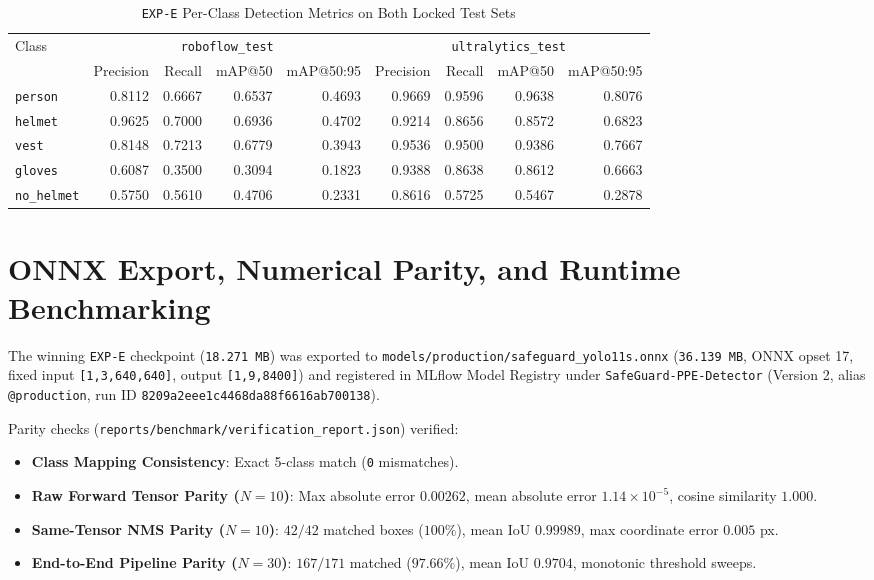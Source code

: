 \documentclass[11pt,a4paper]{article}
\begin{document}
\begin{table}[H]
\centering
\caption{\texttt{EXP-E} Per-Class Detection Metrics on Both Locked Test Sets}
\label{tab:perclass}
\small
\begin{tabular}{@{}lrrrrrrrr@{}}
\toprule
Class & \multicolumn{4}{c}{\texttt{roboflow\_test}} & \multicolumn{4}{c}{\texttt{ultralytics\_test}} \\
\cmidrule(lr){2-5} \cmidrule(lr){6-9}
 & Precision & Recall & mAP@50 & mAP@50:95 & Precision & Recall & mAP@50 & mAP@50:95 \\
\midrule
\texttt{person} & 0.8112 & 0.6667 & 0.6537 & 0.4693 & 0.9669 & 0.9596 & 0.9638 & 0.8076 \\
\texttt{helmet} & 0.9625 & 0.7000 & 0.6936 & 0.4702 & 0.9214 & 0.8656 & 0.8572 & 0.6823 \\
\texttt{vest} & 0.8148 & 0.7213 & 0.6779 & 0.3943 & 0.9536 & 0.9500 & 0.9386 & 0.7667 \\
\texttt{gloves} & 0.6087 & 0.3500 & 0.3094 & 0.1823 & 0.9388 & 0.8638 & 0.8612 & 0.6663 \\
\texttt{no\_helmet} & 0.5750 & 0.5610 & 0.4706 & 0.2331 & 0.8616 & 0.5725 & 0.5467 & 0.2878 \\
\bottomrule
\end{tabular}
\end{table}

\section{ONNX Export, Numerical Parity, and Runtime Benchmarking}

The winning \texttt{EXP-E} checkpoint (\texttt{18.271 MB}) was exported to \texttt{models/production/safeguard\_yolo11s.onnx} (\texttt{36.139 MB}, ONNX opset 17, fixed input \texttt{[1,3,640,640]}, output \texttt{[1,9,8400]}) and registered in MLflow Model Registry under \texttt{SafeGuard-PPE-Detector} (Version 2, alias \texttt{@production}, run ID \texttt{8209a2eee1c4468da88f6616ab700138}).

Parity checks (\texttt{reports/benchmark/verification\_report.json}) verified:
\begin{itemize}
  \item \textbf{Class Mapping Consistency}: Exact 5-class match (\texttt{0} mismatches).
  \item \textbf{Raw Forward Tensor Parity ($N=10$)}: Max absolute error $0.00262$, mean absolute error $1.14 \times 10^{-5}$, cosine similarity $1.000$.
  \item \textbf{Same-Tensor NMS Parity ($N=10$)}: $42/42$ matched boxes ($100\%$), mean IoU $0.99989$, max coordinate error $0.005$ px.
  \item \textbf{End-to-End Pipeline Parity ($N=30$)}: $167/171$ matched ($97.66\%$), mean IoU $0.9704$, monotonic threshold sweeps.
\end{itemize}
\end{document}
